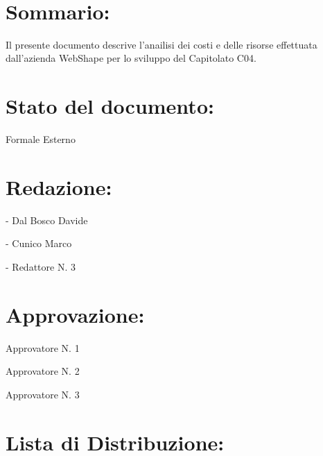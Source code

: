 \newpage

\begin{center} %
	\begin{Huge}	
				\textbf{\TITOLODOC}
			\\
	\end{Huge}
\end{center}

\section*{\Large Sommario:}
Il presente documento descrive l'anailisi dei costi e delle risorse effettuata dall'azienda WebShape per lo sviluppo del Capitolato C04.

\indent \indent

\section*{\Large Stato del documento:}
\indent \indent
	Formale Esterno

\section*{\Large Redazione:}
	\begin{elencopuntato}[\normindent]
		\item[-] Dal Bosco Davide
		\item[-] Cunico Marco
		\item[-] Redattore N. 3
	\end{elencopuntato}

\section*{\Large Approvazione:}
	\begin{elencopuntato}[\normindent]
		\item Approvatore N. 1
		\item Approvatore N. 2
		\item Approvatore N. 3
	\end{elencopuntato}

\section*{\LARGE Lista di Distribuzione:}

